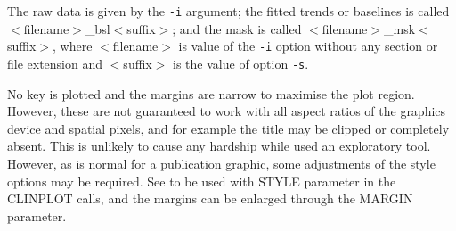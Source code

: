\documentclass[twoside,11pt,nolof]{starlink}
\begin{document}
{{{         \sstitem

         The raw data is given by the \texttt{-i} argument; the fitted
	 trends or baselines is called $<$filename$>$\_bsl$<$suffix$>$;
         and the mask is called $<$filename$>$\_msk$<$suffix$>$, where
         $<$filename$>$ is value of the \texttt{-i} option without any section
         or file extension and $<$suffix$>$ is the value of option \texttt{-s}.

         \sstitem
         No key is plotted and the margins are narrow to maximise the
         plot region.  However, these are not guaranteed to work with
         all aspect ratios of the graphics device and spatial pixels, and
         for example the title may be clipped or completely absent.  This
         is unlikely to cause any hardship while used an exploratory tool.
         However, as is normal for a publication graphic, some adjustments
         of the style options may be required.  See  
         to be used with STYLE parameter in the CLINPLOT calls, and the
         margins can be enlarged through the MARGIN parameter.
      }
   }
}
\newpage
\end{document}
